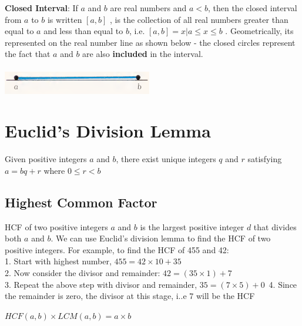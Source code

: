 \documentclass{book}
\begin{document}
	\textbf{Closed Interval}:  If $a$ and $b$ are real numbers and $a<b$,  then the closed interval from $a$ to $b$ is written $[a,b]$ , is the collection of all real numbers greater than equal to $a$ and less than equal to $b$, i.e. $[a,b] = {{x | a \leq x \leq b}}$ . Geometrically, its represented on the real number line as shown below - the closed circles represent the fact that $a$ and $b$ are also \textbf{included} in the interval. 	\\
	\\
	\includegraphics[scale=0.5]{closedinterval}
	
	\section{Euclid's Division Lemma}
	\begin{mdframed}[backgroundcolor=yellow]
		Given positive integers $a$ and $b$, there exist unique integers $q$ and $r$ satisfying $a = bq + r$ where $0 \leq r < b$
	\end{mdframed}
	
	\subsection{Highest Common Factor}
	HCF of two positive integers $a$ and $b$ is the largest positive integer $d$ that divides both $a$ and $b$. We can use Euclid’s division lemma to find the HCF of two positive integers. For example, to find the HCF of 455 and 42: \\
	1. Start with highest number, $455 = 42 \times 10 + 35$ \\
	2. Now consider the divisor and remainder: $42 = (35 \times 1) + 7$ \\
	3. Repeat the above step with divisor and remainder, $35 = (7 \times 5) + 0$\
	4. Since the remainder is zero, the divisor at this stage, i..e $7$ will be the HCF \\
	
	\begin{mdframed}[backgroundcolor=yellow]
		$HCF(a,b) \times LCM (a,b) = a \times b$
	\end{mdframed}
\end{document}
